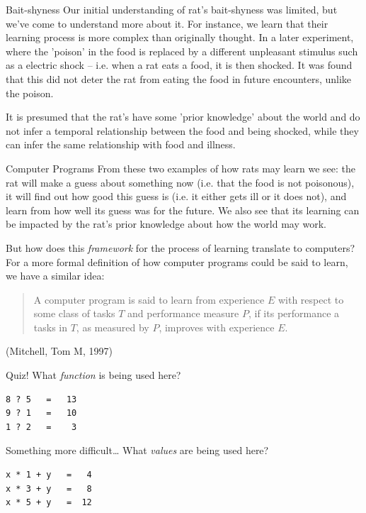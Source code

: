 \documentclass[10pt]{beamer}
\begin{document}
\begin{frame}[label={sec:org03ec218}]{Bait-shyness}
Our initial understanding of rat's bait-shyness was limited, but we've come to
understand more about it. For instance, we learn that their learning process is more
complex than originally thought. In a later experiment, where the 'poison' in the
food is replaced by a different unpleasant stimulus such as a electric shock --
i.e. when a rat eats a food, it is then shocked. It was found that this did not
deter the rat from eating the food in future encounters, unlike the poison.

It is presumed that the rat's have some 'prior knowledge' about the world and do not
infer a temporal relationship between the food and being shocked, while they can
infer the same relationship with food and illness.
\end{frame}

\begin{frame}[label={sec:org642062e}]{Computer Programs}
From these two examples of how rats may learn we see: the rat will make a guess about
something now (i.e. that the food is not poisonous), it will find out how good this
guess is (i.e. it either gets ill or it does not), and learn from how well its guess
was for the future. We also see that its learning can be impacted by the rat's prior
knowledge about how the world may work.

But how does this \emph{framework} for the process of learning translate to computers? For a
more formal definition of how computer programs could be said to learn, we have a
similar idea:

\begin{quote}
A computer program is said to learn from experience \(E\) with respect
to some class of tasks \(T\) and performance measure \(P\), if its performance
a tasks in \(T\), as measured by \(P\), improves with experience \(E\).
\end{quote}

(Mitchell, Tom M, 1997)
\end{frame}

\begin{frame}[label={sec:orgcd1d482},fragile]{Quiz!}
 What \emph{function} is being used here?

\begin{verbatim}
8 ? 5   =   13
9 ? 1   =   10
1 ? 2   =    3
\end{verbatim}
\end{frame}

\begin{frame}[label={sec:orgc6777bb},fragile]{Something more difficult\ldots{}}
 What \emph{values} are being used here?

\begin{verbatim}
x * 1 + y   =   4
x * 3 + y   =   8
x * 5 + y   =  12
\end{verbatim}
\end{frame}
\end{document}
